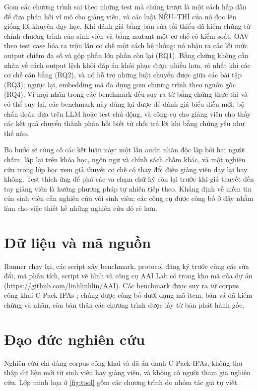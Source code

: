 \documentclass[a4paper,preprint,12pt,authoryear]{elsarticle}
\begin{document}
Gom các chương trình sai theo những test mà chúng trượt là một cách hấp dẫn để đưa phản hồi vĩ mô cho giảng viên, và các luật NẾU--THÌ của nó đọc lên giống lời khuyên dạy học. Khi đánh giá bằng bản sửa tối thiểu đã kiểm chứng từ chính chương trình của sinh viên và bằng mutant một cơ chế có kiểm soát, OAV theo test case hóa ra trộn lẫn cơ chế một cách hệ thống: nó nhận ra các lỗi mức output chiếm đa số và gộp phần lớn phần còn lại (RQ1). Bằng chứng không cần nhãn về cách output lệch khỏi đáp án khôi phục được nhiều hơn, rõ nhất khi các cơ chế cân bằng (RQ2), và nó hỗ trợ những luật chuyển được giữa các bài tập (RQ3); ngược lại, embedding mã đa dụng gom chương trình theo nguồn gốc (RQ4). Vì mọi nhãn trong các benchmark đều suy ra từ bằng chứng thực thi và có thể suy lại, các benchmark này dùng lại được để đánh giá biểu diễn mới, bộ chẩn đoán dựa trên LLM hoặc test chủ động, và công cụ cho giảng viên cho thấy các kết quả chuyển thành phản hồi biết từ chối trả lời khi bằng chứng yếu như thế nào.

Ba bước sẽ củng cố các kết luận này: một lần audit nhãn độc lập bởi hai người chấm, lặp lại trên khóa học, ngôn ngữ và chính sách chấm khác, và một nghiên cứu trong lớp học xem giả thuyết cơ chế có thay đổi điều giảng viên dạy lại hay không. Test thích ứng để phá các va chạm chữ ký còn lại trước khi giả thuyết đến tay giảng viên là hướng phương pháp tự nhiên tiếp theo. Khẳng định về niềm tin của sinh viên cần nghiên cứu với sinh viên; các công cụ được công bố ở đây nhằm làm cho việc thiết kế những nghiên cứu đó rẻ hơn.

\section*{Dữ liệu và mã nguồn}
Runner chạy lại, các script xây benchmark, protocol đăng ký trước cùng các sửa đổi, mã phân tích, script vẽ hình và công cụ AAI Lab có trong kho mã của dự án (\url{https://github.com/linhlinhlin/AAI}). Các benchmark được suy ra từ corpus công khai C-Pack-IPAs \citep{orvalho2024cpack}; chúng được công bố dưới dạng mã item, bản vá đã kiểm chứng và nhãn, còn bản thân các chương trình được lấy từ bản phát hành gốc.

\section*{Đạo đức nghiên cứu}
Nghiên cứu chỉ dùng corpus công khai và đã ẩn danh C-Pack-IPAs; không thu thập dữ liệu mới từ sinh viên hay giảng viên, và không có người tham gia nghiên cứu. Lớp minh họa ở \cref{fig:tool} gồm các chương trình do nhóm tác giả tự viết.
\end{document}
